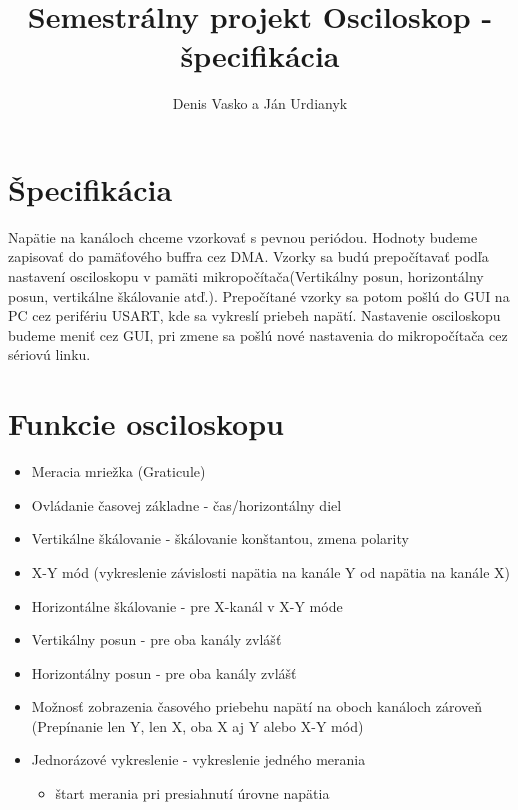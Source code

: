\documentclass{article}
\begin{document}
	\title{ Semestrálny projekt Osciloskop - špecifikácia }
	\author{Denis Vasko a Ján Urdianyk} 
	\maketitle
	\thispagestyle{empty}
	\section{Špecifikácia}
	Napätie na kanáloch chceme vzorkovať s pevnou periódou. Hodnoty budeme zapisovať do pamäťového buffra cez DMA. Vzorky sa budú prepočítavať podľa nastavení osciloskopu v pamäti mikropočítača(Vertikálny posun, horizontálny posun, vertikálne škálovanie atď.). Prepočítané vzorky sa potom pošlú do GUI na PC cez perifériu USART, kde sa vykreslí priebeh napätí. Nastavenie osciloskopu budeme meniť cez GUI, pri zmene sa pošlú nové nastavenia do mikropočítača cez sériovú linku.
\section{Funkcie osciloskopu}
\begin{itemize}
	\item Meracia mriežka (Graticule) 
	\item Ovládanie časovej základne - čas/horizontálny diel
	\item Vertikálne škálovanie - škálovanie konštantou, zmena polarity
	\item X-Y mód (vykreslenie závislosti napätia na kanále Y od napätia na kanále X)
	\item Horizontálne škálovanie - pre X-kanál v X-Y móde
	\item Vertikálny posun - pre oba kanály zvlášť
	\item Horizontálny posun - pre oba kanály zvlášť
	\item Možnosť zobrazenia časového priebehu napätí na oboch kanáloch zároveň (Prepínanie len Y, len X, oba X aj Y alebo X-Y mód)
	\item Jednorázové vykreslenie - vykreslenie jedného merania 
	\begin{itemize}
		\item štart merania pri presiahnutí úrovne napätia
	\end{itemize}
\end{itemize} 
\end{document}
